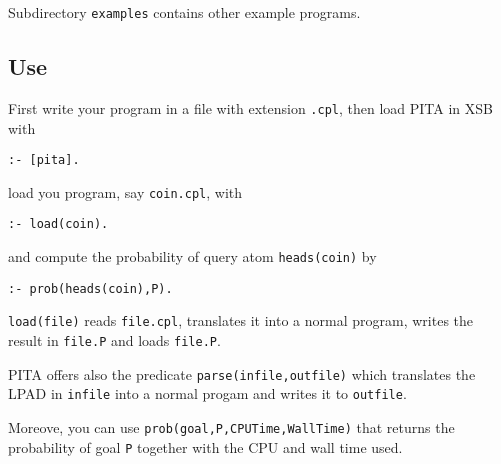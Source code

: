 Subdirectory \texttt{examples} contains other example programs.

\subsection{Use}

First write your program in a file with extension \texttt{.cpl}, then load PITA in XSB with
\begin{verbatim}
:- [pita].
\end{verbatim}
load you program, say \texttt{coin.cpl}, with 
\begin{verbatim}
:- load(coin).
\end{verbatim}
and compute the probability of query atom \texttt{heads(coin)} by
\begin{verbatim}
:- prob(heads(coin),P).
\end{verbatim} 
%
\texttt{load(file)} reads \texttt{file.cpl}, translates it into a normal  program, writes the result in \texttt{file.P} and loads \texttt{file.P}.

PITA offers also the predicate \texttt{parse(infile,outfile)} which translates the LPAD in \texttt{infile} into a normal progam and writes it to  \texttt{outfile}.

Moreove, you can use \texttt{prob(goal,P,CPUTime,WallTime)} that returns the probability of goal \texttt{P} together with the CPU and wall time used.

